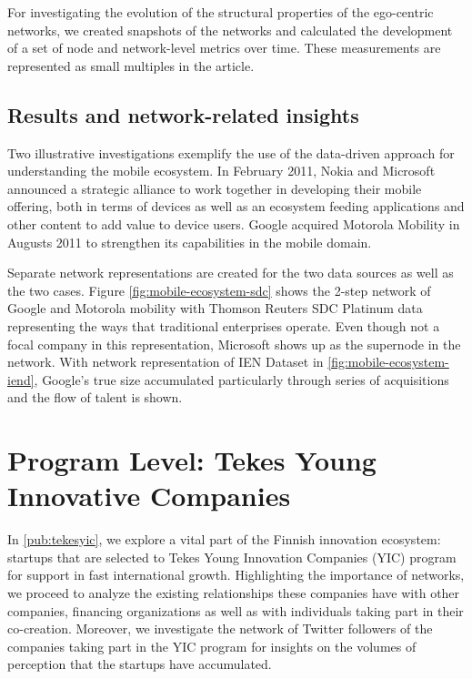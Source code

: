 For investigating the evolution of the structural properties of the ego-centric networks, we created snapshots of the networks and calculated the development of a set of node and network-level metrics over time. These measurements are represented as small multiples in the article.

\subsection{Results and network-related insights}

Two illustrative investigations exemplify the use of the data-driven approach for understanding the mobile ecosystem. In February 2011, Nokia and Microsoft announced a strategic alliance to work together in developing their mobile offering, both in terms of devices as well as an ecosystem feeding applications and other content to add value to device users. Google acquired Motorola Mobility in Augusts 2011 to strengthen its capabilities in the mobile domain.

Separate network representations are created for the two data sources as well as the two cases. Figure \ref{fig:mobile-ecosystem-sdc} shows the 2-step network of Google and Motorola mobility with Thomson Reuters SDC Platinum data representing the ways that traditional enterprises operate. Even though not a focal company in this representation, Microsoft shows up as the supernode in the network. With network representation of IEN Dataset in \ref{fig:mobile-ecosystem-iend}, Google's true size accumulated particularly through series of acquisitions and the flow of talent is shown. 

\section{Program Level: Tekes Young Innovative Companies}

In \ref{pub:tekesyic}, we \citep{Huhtamaki2012NetworksFinland} explore a vital part of the Finnish innovation ecosystem: startups that are selected to Tekes Young Innovation Companies (YIC) program  for support in fast international growth. Highlighting the importance of networks, we proceed to analyze the existing relationships these companies have with other companies, financing organizations as well as with individuals taking part in their co-creation. Moreover, we investigate the network of Twitter followers of the companies taking part in the YIC program for insights on the volumes of perception that the startups have accumulated.

